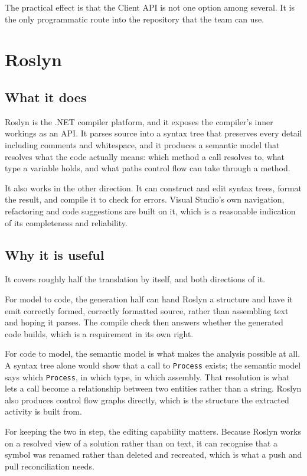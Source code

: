 The practical effect is that the Client API is not one option among several. It
is the only programmatic route into the repository that the team can use.

\section{Roslyn}
\label{sec:roslyn}

\subsection{What it does}

Roslyn is the .NET compiler platform, and it exposes the compiler's inner workings
as an API. It parses source into a syntax tree that preserves every detail
including comments and whitespace, and it produces a semantic model that resolves
what the code actually means: which method a call resolves to, what type a
variable holds, and what paths control flow can take through a method.

It also works in the other direction. It can construct and edit syntax trees,
format the result, and compile it to check for errors. Visual Studio's own
navigation, refactoring and code suggestions are built on it, which is a
reasonable indication of its completeness and reliability.

\subsection{Why it is useful}

It covers roughly half the translation by itself, and both directions of it.

For model to code, the generation half can hand Roslyn a structure and have it
emit correctly formed, correctly formatted source, rather than assembling text
and hoping it parses. The compile check then answers whether the generated code
builds, which is a requirement in its own right.

For code to model, the semantic model is what makes the analysis possible at all.
A syntax tree alone would show that a call to \texttt{Process} exists; the
semantic model says which \texttt{Process}, in which type, in which assembly.
That resolution is what lets a call become a relationship between two entities
rather than a string. Roslyn also produces control flow graphs directly, which is
the structure the extracted activity is built from.

For keeping the two in step, the editing capability matters. Because Roslyn works
on a resolved view of a solution rather than on text, it can recognise that a
symbol was renamed rather than deleted and recreated, which is what a push and
pull reconciliation needs.

